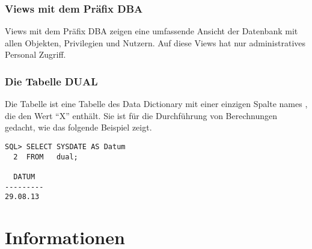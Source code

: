         \subsubsection{Views mit dem Pr\"afix DBA}
          Views mit dem Pr\"afix DBA zeigen eine umfassende Ansicht der Datenbank mit allen Objekten, Privilegien und Nutzern. Auf diese Views hat nur administratives Personal Zugriff.
        \subsubsection{Die Tabelle DUAL}
          Die Tabelle  ist eine Tabelle des Data Dictionary mit einer einzigen Spalte names , die den Wert \enquote{X} enth\"alt. Sie ist f\"ur die Durchf\"uhrung von Berechnungen gedacht, wie das folgende Beispiel zeigt.
        \begin{lstlisting}[caption={Die Tabelle DUAL},label=admin53,language=oracle_sql]
SQL> SELECT SYSDATE AS Datum
  2  FROM   dual;

  DATUM
---------
29.08.13
        \end{lstlisting}

        \begin{literaturinternet}
          \item \cite{i125539}
          \item \cite{i2112}
        \end{literaturinternet}
\clearpage
    \section{Informationen}

